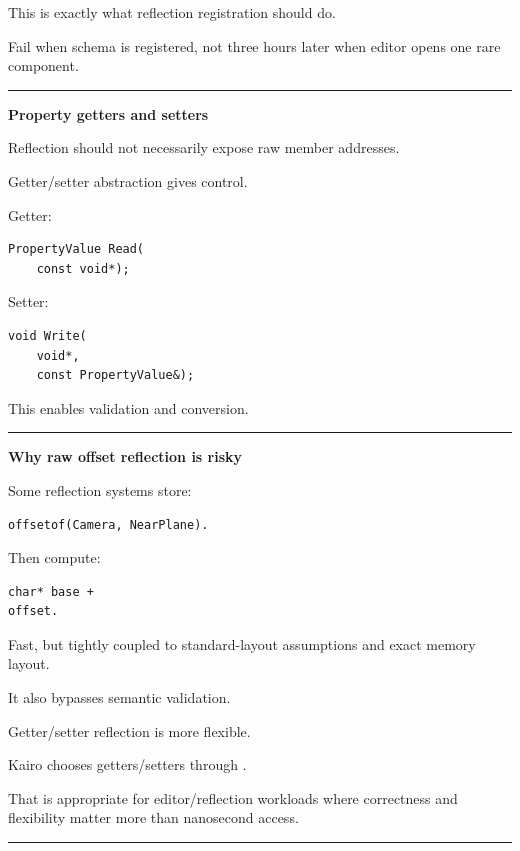 This is exactly what reflection registration should do.

Fail when schema is registered, not three hours later when editor opens one rare component.

\begin{center}\rule{0.5\linewidth}{0.5pt}\end{center}

\textbf{Property getters and setters}

Reflection should not necessarily expose raw member addresses.

Getter/setter abstraction gives control.

Getter:

\begin{verbatim}
PropertyValue Read(
    const void*);
\end{verbatim}

Setter:

\begin{verbatim}
void Write(
    void*,
    const PropertyValue&);
\end{verbatim}

This enables validation and conversion.

\begin{center}\rule{0.5\linewidth}{0.5pt}\end{center}

\textbf{Why raw offset reflection is risky}

Some reflection systems store:

\begin{verbatim}
offsetof(Camera, NearPlane).
\end{verbatim}

Then compute:

\begin{verbatim}
char* base +
offset.
\end{verbatim}

Fast, but tightly coupled to standard-layout assumptions and exact memory layout.

It also bypasses semantic validation.

Getter/setter reflection is more flexible.

Kairo chooses getters/setters through .

That is appropriate for editor/reflection workloads where correctness and flexibility matter more than nanosecond access.

\begin{center}\rule{0.5\linewidth}{0.5pt}\end{center}

